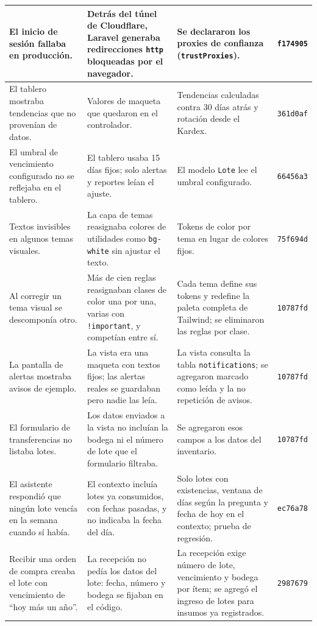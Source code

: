 {\begin{longtable}{|p{3.6cm}|p{5.6cm}|p{4.2cm}|p{1.4cm}|}
El inicio de sesión fallaba en producción. & Detrás del túnel de Cloudflare, Laravel generaba redirecciones \texttt{http} bloqueadas por el navegador. & Se declararon los proxies de confianza (\texttt{trustProxies}). & \texttt{f174905} \\ \hline
El tablero mostraba tendencias que no provenían de datos. & Valores de maqueta que quedaron en el controlador. & Tendencias calculadas contra 30 días atrás y rotación desde el Kardex. & \texttt{361d0af} \\ \hline
El umbral de vencimiento configurado no se reflejaba en el tablero. & El tablero usaba 15 días fijos; solo alertas y reportes leían el ajuste. & El modelo \texttt{Lote} lee el umbral configurado. & \texttt{66456a3} \\ \hline
Textos invisibles en algunos temas visuales. & La capa de temas reasignaba colores de utilidades como \texttt{bg-white} sin ajustar el texto. & Tokens de color por tema en lugar de colores fijos. & \texttt{75f694d} \\ \hline
Al corregir un tema visual se descomponía otro. & Más de cien reglas reasignaban clases de color una por una, varias con \texttt{!important}, y competían entre sí. & Cada tema define sus tokens y redefine la paleta completa de Tailwind; se eliminaron las reglas por clase. & \texttt{10787fd} \\ \hline
La pantalla de alertas mostraba avisos de ejemplo. & La vista era una maqueta con textos fijos; las alertas reales se guardaban pero nadie las leía. & La vista consulta la tabla \texttt{notifications}; se agregaron marcado como leída y la no repetición de avisos. & \texttt{10787fd} \\ \hline
El formulario de transferencias no listaba lotes. & Los datos enviados a la vista no incluían la bodega ni el número de lote que el formulario filtraba. & Se agregaron esos campos a los datos del inventario. & \texttt{10787fd} \\ \hline
El asistente respondió que ningún lote vencía en la semana cuando sí había. & El contexto incluía lotes ya consumidos, con fechas pasadas, y no indicaba la fecha del día. & Solo lotes con existencias, ventana de días según la pregunta y fecha de hoy en el contexto; prueba de regresión. & \texttt{ec76a78} \\ \hline
Recibir una orden de compra creaba el lote con vencimiento de ``hoy más un año''. & La recepción no pedía los datos del lote: fecha, número y bodega se fijaban en el código. & La recepción exige número de lote, vencimiento y bodega por ítem; se agregó el ingreso de lotes para insumos ya registrados. & \texttt{2987679} \\ \hline

\end{longtable}}
